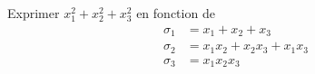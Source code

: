 Exprimer $x_1^2+x_2^2+x_3^2$ en fonction de 
\begin{align*}
 \sigma_1 &= x_1+x_2+x_3 \\
 \sigma_2 &= x_1x_2 + x_2x_3 + x_1x_3\\
 \sigma_3 &= x_1 x_2 x_3 
\end{align*}
\bigskip
